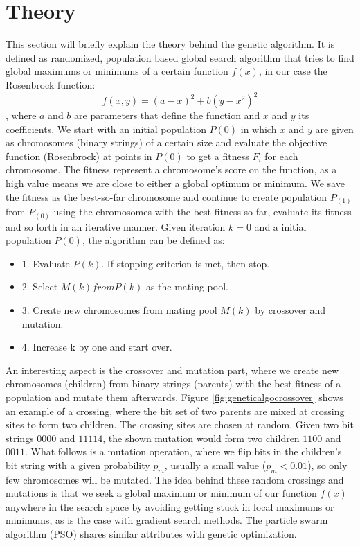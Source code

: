 \section{Theory}

This section will briefly explain the theory behind the genetic algorithm. It is defined as randomized, population based global search algorithm that tries to find global maximums or minimums of a certain function $f(x)$, in our case the Rosenbrock function: $$f(x,y) = (a-x)^2+b(y-x^2)^2$$, where $a$ and $b$ are parameters that define the function and $x$ and $y$ its coefficients. We start with an initial population $P(0)$ in which $x$ and $y$ are given as chromosomes (binary strings) of a certain size and evaluate the objective function (Rosenbrock) at points in $P(0)$ to get a fitness $F_{i}$ for each chromosome. The fitness represent a chromosome's score on the function, as a high value means we are close to either a global optimum or minimum. We save the fitness as the best-so-far chromosome and continue to create population $P_(1)$ from $P_(0)$ using the chromosomes with the best fitness so far, evaluate its fitness and so forth in an iterative manner. Given iteration $k=0$ and a initial population $P(0)$, the algorithm can be defined as\cite{Chong}:

\begin{itemize}
	\item 1. Evaluate $P(k)$. If stopping criterion is met, then stop.
	\item 2. Select $M(k) from P(k)$ as the mating pool.
	\item 3. Create new chromosomes from mating pool $M(k)$ by crossover and mutation.
	\item 4. Increase k by one and start over.
\end{itemize}

An interesting aspect is the crossover and mutation part, where we create new chromosomes (children) from binary strings (parents) with the best fitness of a population and mutate them afterwards. Figure \ref{fig:geneticalgocrossover} shows an example of a crossing, where the bit set of two parents are mixed at crossing sites to form two children. The crossing sites are chosen at random. Given two bit strings $0000$ and $11114$, the shown mutation would form two children $1100$ and $0011$. What follows is a mutation operation, where we flip bits in the children's bit string with a given probability $p_{m}$, usually a small value ($p_{m} < 0.01$), so only few chromosomes will be mutated. The idea behind these random crossings and mutations is that we seek a global maximum or minimum of our function $f(x)$ anywhere in the search space by avoiding getting stuck in local maximums or minimums, as is the case with gradient search methods. The particle swarm algorithm (PSO) shares similar attributes with genetic optimization.

